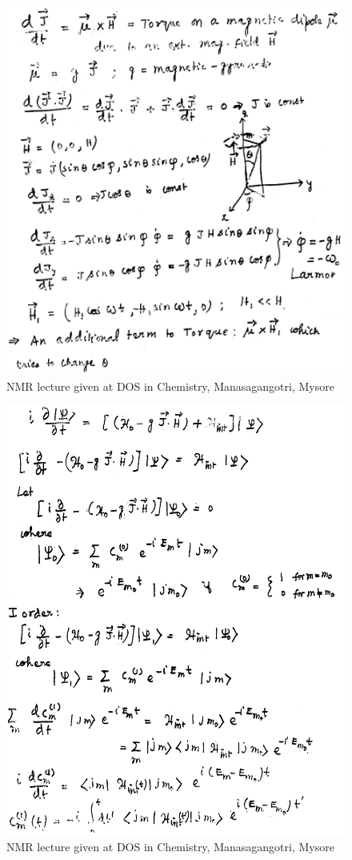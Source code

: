 \begin{figure}[H]
\centering
\includegraphics[scale=0.485]{src/images/chap8/3.eps}
\caption{NMR lecture given at DOS in Chemistry, Manasagangotri, Mysore}
\end{figure}
\begin{figure}[H]
\centering
\includegraphics[scale=0.48]{src/images/chap8/4.eps}
\caption{NMR lecture given at DOS in Chemistry, Manasagangotri, Mysore}
\end{figure}
